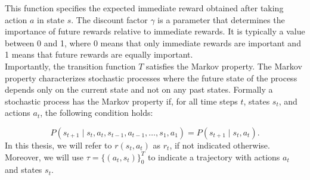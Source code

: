 This function specifies the expected immediate reward obtained after taking action $a$ in state $s$. The discount factor $\gamma$ is a 
parameter that determines the importance of future rewards relative to immediate rewards. It is typically a value between 0 and 1, where 0 means that 
only immediate rewards are important and 1 means that future rewards are equally important. \\

Importantly, the transition function $T$ satisfies the Markov property. The Markov property characterizes stochastic processes where the future state of the 
process depends only on the current state and not on any past states. Formally a stochastic process has the Markov property if, 
for all time steps $t$, states $s_t$, and actions $a_t$, the following condition holds:

\begin{equation*}
    P(s_{t+1} \mid s_t, a_t, s_{t-1}, a_{t-1}, \ldots, s_1, a_1) = P(s_{t+1} \mid s_t, a_t).
\end{equation*}
In this thesis, we will refer to $r(s_t, a_t)$ as $r_t$, if not indicated otherwise. Moreover, we will use $\tau = \{(a_t, s_t)\}_0^T$ to 
indicate a trajectory with actions $a_t$ and states $s_t$.

